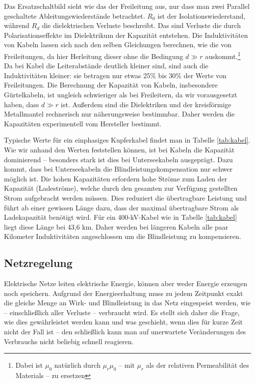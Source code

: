 Das Ersatzschaltbild sieht wie das der Freileitung aus, nur dass man zwei Parallel geschaltete Ableitungswiederstände betrachtet.
$R_0$ ist der Isolationswiederstand, während $R_d$ die dielektrischen Verluste beschreibt. Das sind Verluste die durch Polarisationseffekte im Dielektrikum der Kapazität entstehen.
Die Induktivitäten von Kabeln lassen sich nach den selben Gleichungen berechnen, wie die von Freileitungen, da hier Herleitung dieser ohne die Bedingung $d\gg r$ auskommt.\footnote{Dabei ist $\mu_0$ natürlich durch $\mu_r\mu_0$ – mit $\mu_r$ als der relativen Permeabilität des Materials – zu ersetzen} %
Da bei Kabel die Leiterabstände deutlich kleiner sind, sind auch die Induktivitäten kleiner: sie betragen nur etwas 25\% bis 30\% der Werte von Freileitungen\cite{Flosdorff}.
Die Berechnung der Kapazität von Kabeln, insbesondere Gürtelkabeln, ist ungleich schwieriger als bei Freileitern, da wir vorausgesetzt haben, dass $d\gg r$ ist. Außerdem sind die Dielektriken und der kreisförmige Metallmantel rechnerisch nur näherungsweise bestimmbar. Daher werden die Kapazitäten experimentell vom Hersteller bestimmt.\cite{Flosdorff}

Typische Werte für ein einphasiges Kupferkabel findet man in Tabelle \ref{tab:kabel}.
Wie wir anhand den Werten feststellen können, ist bei Kabeln die Kapazität dominierend --
besonders stark ist dies bei Unterseekabeln ausgeprägt. %
Dazu kommt, dass bei Unterseekabeln die Blindleistungskompensation nur schwer möglich ist.
Die hohen Kapazitäten erfordern hohe Ströme zum Laden der Kapazität (Ladeströme), welche durch den gesamten zur Verfügung gestellten Strom aufgebracht werden müssen.
Dies reduziert die übertragbare Leistung und führt ab einer gewissen Länge dazu, dass der maximal übertragbare Strom als Ladekapazität benötigt wird.
Für ein 400-kV-Kabel wie in Tabelle \ref{tab:kabel} liegt diese Länge bei 43,6 km.
Daher werden bei längeren Kabeln alle paar Kilometer %
Induktivitäten angeschlossen um die Blindleistung zu kompensieren.

\subsection{Netzregelung}
Elektrische Netze leiten elektrische Energie, können aber weder Energie erzeugen noch speichern.
Aufgrund der Energieerhaltung muss zu jedem Zeitpunkt exakt die gleiche Menge an Wirk- und Blindleistung in das Netz eingespeist werden, wie – einschließlich aller Verluste – verbraucht wird.
Es stellt sich daher die Frage, wie dies gewährleistet werden kann und was geschieht, wenn dies für kurze Zeit nicht der Fall ist – den schließlich kann man auf unerwartete Veränderungen des Verbrauchs nicht beliebig schnell reagieren.

